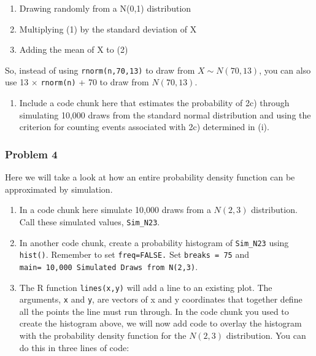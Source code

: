 \documentclass[]{article}
\providecommand{\tightlist}{%
  \setlength{\itemsep}{0pt}\setlength{\parskip}{0pt}}
\begin{document}
\begin{enumerate}
\def\labelenumi{\arabic{enumi})}
\tightlist
\item
  Drawing randomly from a N(0,1) distribution
\item
  Multiplying (1) by the standard deviation of X
\item
  Adding the mean of X to (2)
\end{enumerate}

So, instead of using \texttt{rnorm(n,70,13)} to draw from
\(X \sim N(70,13)\), you can also use 13 \(\times\) \texttt{rnorm(n)} +
70 to draw from \(N(70, 13)\).

\begin{enumerate}
\def\labelenumi{\roman{enumi})}
\setcounter{enumi}{1}
\tightlist
\item
  Include a code chunk here that estimates the probability of 2c)
  through simulating 10,000 draws from the standard normal distribution
  and using the criterion for counting events associated with 2c)
  determined in (i).
\end{enumerate}

\hypertarget{problem-4}{%
\subsubsection{Problem 4}\label{problem-4}}

Here we will take a look at how an entire probability density function
can be approximated by simulation.

\begin{enumerate}
\def\labelenumi{\roman{enumi})}
\item
  In a code chunk here simulate 10,000 draws from a \(N(2,3)\)
  distribution. Call these simulated values, \texttt{Sim\_N23}.
\item
  In another code chunk, create a probability histogram of
  \texttt{Sim\_N23} using \texttt{hist()}. Remember to set
  \texttt{freq=FALSE.} Set \texttt{breaks\ =\ 75} and
  \texttt{main=\ \textquotesingle{}10,000\ Simulated\ Draws\ from\ N(2,3)\textquotesingle{}}.
\item
  The R function \texttt{lines(x,y)} will add a line to an existing
  plot. The arguments, \texttt{x} and \texttt{y}, are vectors of x and y
  coordinates that together define all the points the line must run
  through. In the code chunk you used to create the histogram above, we
  will now add code to overlay the histogram with the probability
  density function for the \(N(2,3)\) distribution. You can do this in
  three lines of code:
\end{enumerate}
\end{document}

